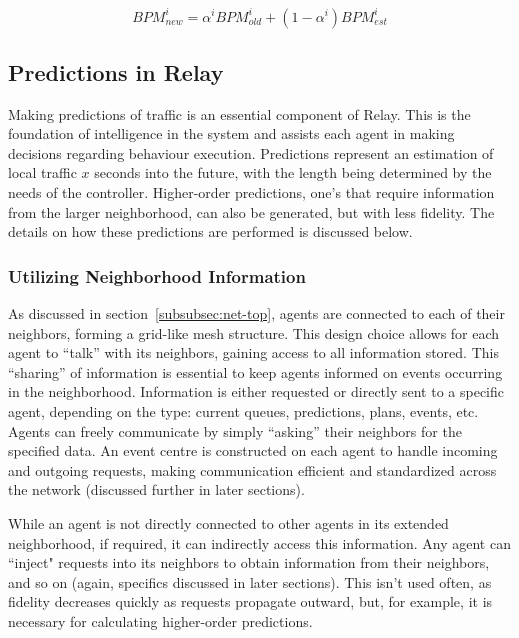 \documentclass{report}
\begin{document}
\begin{equation}
    BPM_{new}^{i} = \alpha^{i}  BPM_{old}^{i} + (1 - \alpha^{i}) BPM_{est}^{i}
    \label{eqn:BPM-update}
\end{equation}

\subsection{Predictions in Relay}
\label{sec:prediction_in_relay}

Making predictions of traffic is an essential component of Relay. 
This is the foundation of intelligence in the system and assists each agent in making decisions regarding behaviour execution. 
Predictions represent an estimation of local traffic $x$ seconds into the future, with the length being determined by the needs of the controller. 
Higher-order predictions, one’s that require information from the larger neighborhood, can also be generated, but with less fidelity. 
The details on how these predictions are performed is discussed below.

\subsubsection{Utilizing Neighborhood Information}
As discussed in section~\ref{subsubsec:net-top}, agents are connected to each of their neighbors, forming a grid-like mesh structure. 
This design choice allows for each agent to ``talk” with its neighbors, gaining access to all information stored. 
This ``sharing” of information is essential to keep agents informed on events occurring in the neighborhood.
Information is either requested or directly sent to a specific agent, depending on the type: current queues, predictions, plans, events, etc.
 Agents can freely communicate by simply ``asking” their neighbors for the specified data. 
An event centre is constructed on each agent to handle incoming and outgoing requests, making communication efficient and standardized across the network (discussed further in later sections).

	While an agent is not directly connected to other agents in its extended neighborhood, if required, it can indirectly access this information. 
Any agent can ``inject" requests into its neighbors to obtain information from their neighbors, and so on (again, specifics discussed in later sections). 
This isn’t used often, as fidelity decreases quickly as requests propagate outward, but, for example, it is necessary for calculating higher-order predictions.
\end{document}
